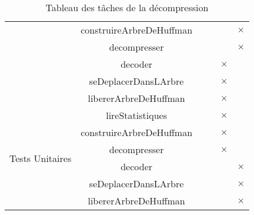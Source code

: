 \begin{table}[ht]
\begin{tabular}{|c|c|>{\centering\arraybackslash}p{1.5cm}|>{\centering\arraybackslash}p{1.5cm}|>{\centering\arraybackslash}p{1.5cm}|>{\centering\arraybackslash}p{1.5cm}|}
        \cline{2-6}
        & construireArbreDeHuffman & & & & $\times$ \\
        \cline{2-6}
        & decompresser & & & & $\times$ \\ 
        \cline{2-6}
        & decoder & & & $\times$ & \\
        \cline{2-6}
        & seDeplacerDansLArbre & & & $\times$ & \\
        \cline{2-6}
        & libererArbreDeHuffman & & & $\times$ & \\
        \hline
         \multirow{6}{*}{Tests Unitaires}
        & lireStatistiques & & & $\times$ & \\
        \cline{2-6}
        & construireArbreDeHuffman & & & $\times$ & \\
        \cline{2-6}
        & decompresser & & & $\times$ & \\ 
        \cline{2-6}
        & decoder & & & & $\times$ \\
        \cline{2-6}
        & seDeplacerDansLArbre & & & & $\times$ \\
        \cline{2-6}
        & libererArbreDeHuffman & & & & $\times$ \\
        \hline
    \end{tabular}
    \caption{Tableau des tâches de la décompression}
  \end{table}  
 
